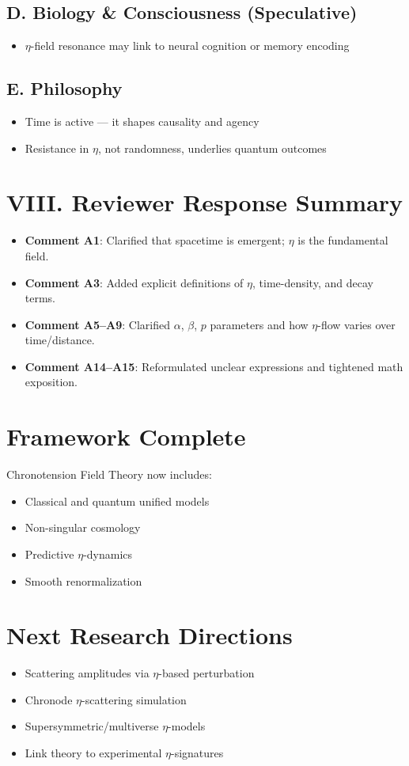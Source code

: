 \documentclass[12pt]{article}
\begin{document}
\subsection*{D. Biology \& Consciousness (Speculative)}
\begin{itemize}
  \item $\eta$-field resonance may link to neural cognition or memory encoding
\end{itemize}

\subsection*{E. Philosophy}
\begin{itemize}
  \item Time is active — it shapes causality and agency
  \item Resistance in $\eta$, not randomness, underlies quantum outcomes
\end{itemize}

\section*{VIII. Reviewer Response Summary}
\begin{itemize}
  \item \textbf{Comment A1}: Clarified that spacetime is emergent; $\eta$ is the fundamental field.
  \item \textbf{Comment A3}: Added explicit definitions of $\eta$, time-density, and decay terms.
  \item \textbf{Comment A5--A9}: Clarified $\alpha$, $\beta$, $p$ parameters and how $\eta$-flow varies over time/distance.
  \item \textbf{Comment A14--A15}: Reformulated unclear expressions and tightened math exposition.
\end{itemize}

\section*{Framework Complete}
Chronotension Field Theory now includes:
\begin{itemize}
  \item Classical and quantum unified models
  \item Non-singular cosmology
  \item Predictive $\eta$-dynamics
  \item Smooth renormalization
\end{itemize}

\section*{Next Research Directions}
\begin{itemize}
  \item Scattering amplitudes via $\eta$-based perturbation
  \item Chronode $\eta$-scattering simulation
  \item Supersymmetric/multiverse $\eta$-models
  \item Link theory to experimental $\eta$-signatures
\end{itemize}
\end{document}
